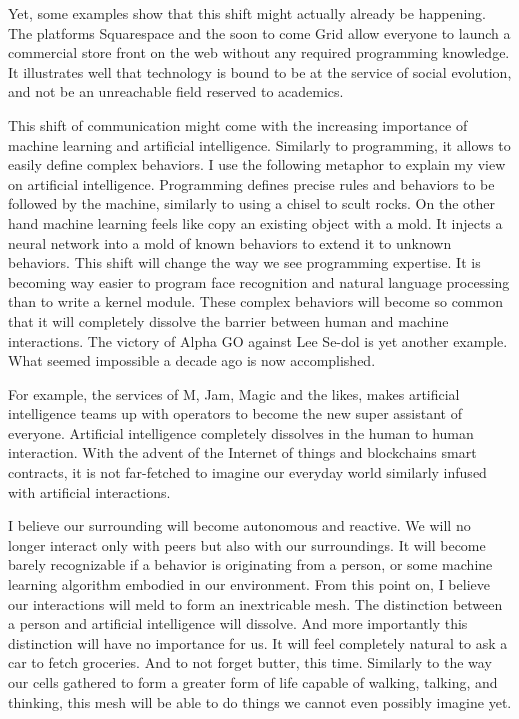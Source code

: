 Yet, some examples show that this shift might actually already be happening.
The platforms Squarespace and the soon to come Grid allow everyone to launch a commercial store front on the web without any required programming knowledge.
It illustrates well that technology is bound to be at the service of social evolution, and not be an unreachable field reserved to academics.

This shift of communication might come with the increasing importance of machine learning and artificial intelligence.
Similarly to programming, it allows to easily define complex behaviors.
I use the following metaphor to explain my view on artificial intelligence.
Programming defines precise rules and behaviors to be followed by the machine, similarly to using a chisel to scult rocks.
On the other hand machine learning feels like copy an existing object with a mold.
It injects a neural network into a mold of known behaviors to extend it to unknown behaviors.
This shift will change the way we see programming expertise.
It is becoming way easier to program face recognition and natural language processing than to write a kernel module.
These complex behaviors will become so common that it will completely dissolve the barrier between human and machine interactions.
The victory of Alpha GO against Lee Se-dol is yet another example.
What seemed impossible a decade ago is now accomplished.

For example, the services of M, Jam, Magic and the likes, makes artificial intelligence teams up with operators to become the new super assistant of everyone.
Artificial intelligence completely dissolves in the human to human interaction.
With the advent of the Internet of things and blockchains smart contracts, it is not far-fetched to imagine our everyday world similarly infused with artificial interactions.

I believe our surrounding will become autonomous and reactive.
We will no longer interact only with peers but also with our surroundings.
It will become barely recognizable if a behavior is originating from a person, or some machine learning algorithm embodied in our environment.
From this point on, I believe our interactions will meld to form an inextricable mesh.
The distinction between a person and artificial intelligence will dissolve.
And more importantly this distinction will have no importance for us.
It will feel completely natural to ask a car to fetch groceries.
And to not forget butter, this time.
Similarly to the way our cells gathered to form a greater form of life capable of walking, talking, and thinking, this mesh will be able to do things we cannot even possibly imagine yet.

